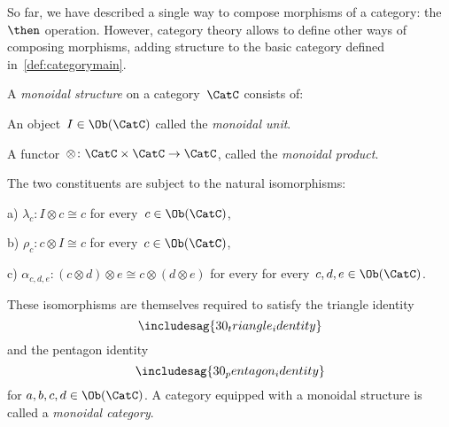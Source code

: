 So far, we have described a single way to compose morphisms of a category: the~$\then$ operation. However, category theory allows to define other ways of composing morphisms, adding structure to the basic category defined in~\cref{def:categorymain}.
\begin{shaded}
\begin{definition}\label{def:monoidal_cat}
A \emph{monoidal structure} on a category~$\CatC$ consists of:
\begin{compactenum}
    \item An object~$I\in \Ob(\CatC)$ called the \emph{monoidal unit}.
    \item A functor~$\otimes \colon \CatC \times \CatC\to \CatC$, called the \emph{monoidal product}.
\end{compactenum}
The two constituents are subject to the natural isomorphisms:
\begin{compactenum}
    \item[a)] $\lambda_c \colon I\otimes c \cong c$ for every~$c\in \Ob(\CatC)$,
    \item[b)] $\rho_c \colon c\otimes I \cong c$ for every~$c\in \Ob(\CatC)$,
    \item[c)] $\alpha_{c,d,e}\colon (c\otimes d)\otimes e \cong c\otimes (d\otimes e)$ for every for every~$c,d,e\in \Ob(\CatC)$.
\end{compactenum}
These isomorphisms are themselves required to satisfy the triangle identity
\begin{equation}
\includesag{30_triangle_identity}
\end{equation}
and the pentagon identity
\begin{equation}
\includesag{30_pentagon_identity}
\end{equation}
for $a,b,c,d\in \Ob(\CatC)$.
\noindent A category equipped with a monoidal structure is called a \emph{monoidal category}.
\end{definition}
\end{shaded}
